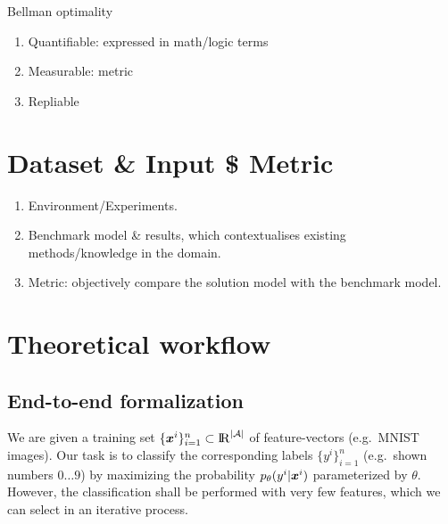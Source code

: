Bellman optimality

\begin{enumerate}
\item
Quantifiable: expressed in math/logic terms
\item
Measurable: metric
\item
Repliable
\end{enumerate}

\section{Dataset \& Input \$ Metric}
\begin{enumerate}
\item
Environment/Experiments.
\item
Benchmark model \& results, which contextualises existing methods/knowledge in the domain.
\item
Metric: objectively compare the solution model with the benchmark model.
\end{enumerate}

\section{Theoretical workflow}
\subsection{End-to-end formalization}
We are given a training set $\{\bm x^i\}_{i=1}^n \subset \mathrm{I\kern-0.4ex R}^{|\mathcal{A}|}$ 
of feature-vectors (e.g.~MNIST images).
Our task is to classify the corresponding labels $\{y^i\}_{i=1}^n$
(e.g.~shown numbers $0 \ldots 9$) by maximizing 
the probability $p_\theta(y^i|\bm x^i)$ parameterized by $\theta$.
However, the classification shall be performed with very few features,
which we can select in an iterative process.


